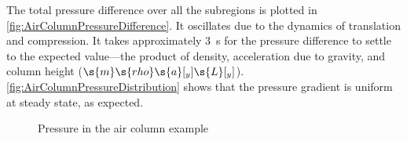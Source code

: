 The total pressure difference over all the subregions is plotted in \autoref{fig:AirColumnPressureDifference}.  It oscillates due to the dynamics of translation and compression.  It takes approximately \SI{3}{s} for the pressure difference to settle to the expected value---the product of density, acceleration due to gravity, and column height ($\s{m}\s{rho}\s{a}[_y]\s{L}[_y]$).  \autoref{fig:AirColumnPressureDistribution} shows that the pressure gradient is uniform at steady state, as expected.

\begin{figure}[htbp]
  \quad
  \caption{Pressure in the air column example}
  \label{fig:AirColumnPressure}
\end{figure}

